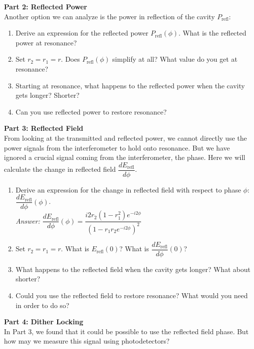 \documentclass[11pt]{article}
\begin{document}
\vspace{0.3cm}

\noindent
\textbf{Part 2: Reflected Power}\\
Another option we can analyze is the power in reflection of the cavity $P_\mathrm{refl}$:

\begin{enumerate}
    \item Derive an expression for the reflected power $P_\mathrm{refl}(\phi)$.  What is the reflected power at resonance?
    \item Set $r_2 = r_1 = r$.  Does $P_\mathrm{refl}(\phi)$ simplify at all?  What value do you get at resonance?
    \item Starting at resonance, what happens to the reflected power when the cavity gets longer? Shorter?
    \item Can you use reflected power to restore resonance?
\end{enumerate}



\noindent
\textbf{Part 3: Reflected Field}\\
From looking at the transmitted and reflected power, we cannot directly use the power signals from the interferometer to hold onto resonance.
But we have ignored a crucial signal coming from the interferometer, the phase.
Here we will calculate the change in reflected field $\dfrac{d E_\mathrm{refl}}{d \phi}$.

\begin{enumerate}
    \item Derive an expression for the change in reflected field with respect to phase $\phi$: $\dfrac{d E_\mathrm{refl}}{d\phi}(\phi)$.\\
    \textit{Answer: $\dfrac{d E_\mathrm{refl}}{d\phi}(\phi) = \dfrac{i 2 r_2 (1 - r_1^2) e^{-i 2 \phi}}{(1 - r_1 r_2 e^{-i 2 \phi})^2}$}
    \item Set $r_2 = r_1 = r$.  What is $E_\mathrm{refl}(0)$?  What is $\dfrac{d E_\mathrm{refl}}{d\phi}(0)$?
    \item What happens to the reflected field when the cavity gets longer? What about shorter?
    \item Could you use the reflected field to restore resonance?  What would you need in order to do so?
\end{enumerate}

\vspace{0.3cm}

\noindent
\textbf{Part 4: Dither Locking}\\
In Part 3, we found that it could be possible to use the reflected field phase.
But how may we measure this signal using photodetectors?
\end{document}
